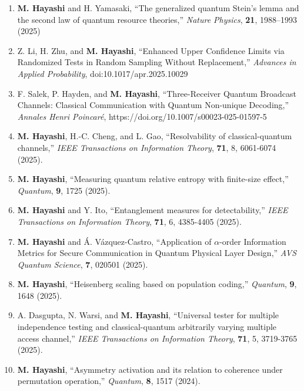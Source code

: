 \documentclass[a4paper,12pt,oneside]{article}
\begin{document}
\begin{enumerate}
\item
\textbf{M. Hayashi} and H. Yamasaki,
``The generalized quantum Stein's lemma and the second law of quantum resource theories,''
{\em Nature Physics}, 
{\bf 21}, 1988–1993 (2025)

\item
Z. Li, H. Zhu, and \textbf{M. Hayashi},
``Enhanced Upper Confidence Limits via Randomized Tests in Random Sampling Without Replacement,''
{\em Advances in Applied Probability}, 
doi:10.1017/apr.2025.10029

\item
F. Salek, P. Hayden, and \textbf{M. Hayashi},
``Three-Receiver Quantum Broadcast Channels: Classical Communication with Quantum Non-unique Decoding,'' 
{\em Annales Henri Poincaré}, 
https://doi.org/10.1007/s00023-025-01597-5

\item
\textbf{M. Hayashi}, H.-C. Cheng, and L. Gao,
``Resolvability of classical-quantum channels,''
{\em IEEE Transactions on Information Theory}, 
{\bf 71}, 8, 6061-6074 (2025).

\item
\textbf{M. Hayashi},
``Measuring quantum relative entropy with finite-size effect,''
{\em Quantum}, {\bf 9}, 1725 (2025).

\item
\textbf{M. Hayashi} and Y. Ito,
``Entanglement measures for detectability,''
{\em IEEE Transactions on Information Theory}, 
{\bf 71}, 6, 4385-4405 (2025).

\item
\textbf{M. Hayashi} and \'{A}. V\'{a}zquez-Castro,
``Application of $\alpha$-order Information Metrics for Secure Communication in Quantum Physical Layer Design,''
{\em AVS Quantum Science}, {\bf 7}, 020501 (2025).

\item
\textbf{M. Hayashi},
``Heisenberg scaling based on population coding,''
{\em Quantum}, {\bf 9}, 1648 (2025).

\item
A. Dasgupta, N. Warsi, and
\textbf{M. Hayashi},
``Universal tester for multiple independence testing and classical-quantum arbitrarily varying multiple access channel,''
{\em IEEE Transactions on Information Theory}, 
{\bf 71}, 5, 3719-3765 (2025).

\item
\textbf{M. Hayashi},
``Asymmetry activation and its relation to coherence under permutation operation,''
{\em Quantum}, {\bf 8}, 1517 (2024).


\end{enumerate}
\end{document}
